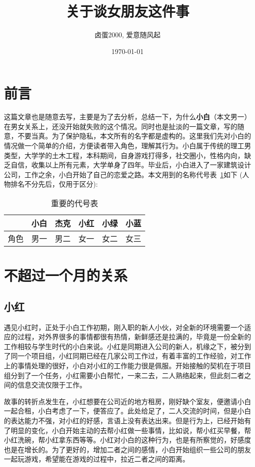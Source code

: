 \documentclass{article}
\title{\textbf{关于谈女朋友这件事}}
\author{卤蛋2000, 爱意随风起}
\date{\today}
\begin{document}
\maketitle

\section{前言}
这篇文章也是随意去写，主要是为了去分析，总结一下，为什么\textbf{小白}（本文男一）在男女关系上，还没开始就失败的这个情况。同时也是扯淡的一篇文章，写的随意，不要当真。为了保护隐私，本文所有的名字都是虚构的。这里我们先对小白的情况做一个简单的介绍，方便读者带入角色，理解其行为。小白属于传统的理工男类型，大学学的土木工程，本科期间，自身游戏打得多，社交圈小，性格内向，缺乏自信，收集以上所有元素，大学单身了四年。毕业后，小白进入了一家建筑设计公司，工作之余，小白开始了自己的恋爱之路。本文用到的名称代号表~\ref{name_replace}如下 (人物排名不分先后，仅用于区分):


\begin{table}[h]
    \caption{重要的代号表}
    \label{name_replace}
    \centering
    \begin{tabular}{cccccc}
        \toprule
        & 小白 & 杰克 & 小红 & 小绿 & 小蓝 \\
        \midrule
        角色 & 男一 & 男二 & 女一 & 女二 & 女三 \\
        \bottomrule
    \end{tabular}
\end{table}


\section{不超过一个月的关系}
\subsection{小红}
遇见小红时，正处于小白工作初期，刚入职的新人小伙，对全新的环境需要一个适应的过程，对外界很多的事情都很有热情，新鲜感还是拉满的，毕竟是一份全新的工作相较与学生时代的小白来说。小红是同期进入公司的新人，机缘之下，被分到了同一个项目组，小红同期已经在几家公司工作过，有着丰富的工作经验，对工作上的事情处理的很好，小白对小红的工作能力很是佩服。开始接触的契机在于项目组分到了一个任务，小红需要小白帮忙，一来二去，二人熟络起来，但此刻二者之间的信息交流仅限于工作。

故事的转折点发生在，小红想要在公司近的地方租房，刚好缺个室友，便邀请小白一起合租，小白考虑了一下，便答应了。此处给足了，二人交流的时间，但是小白的表达能力不强，对小红的好感，言语上没有表达出来。但是行为上，已经开始有了明显的变化，小白开始主动的去帮小红做一些事情，比如说，帮小红买早餐，帮小红洗碗，帮小红拿东西等等。小红对小白的这种行为，也是有所察觉的，好感度也是在增长的。为了更好的，增加二者之间的感情，小白开始组织一些公司的朋友一起玩游戏，希望能在游戏的过程中，拉近二者之间的距离。
\end{document}
